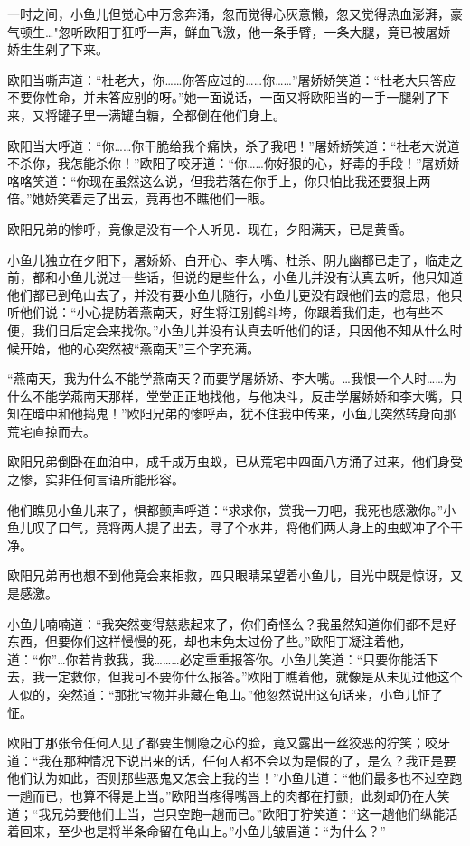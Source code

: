\documentclass[12pt,oneside]{book}
\begin{document}
一时之间，小鱼儿但觉心中万念奔涌，忽而觉得心灰意懒，忽又觉得热血澎湃，豪气顿生\ldots"忽听欧阳丁狂呼一声，鲜血飞激，他一条手臂，一条大腿，竟已被屠娇娇生生剁了下来。

欧阳当嘶声道：``杜老大，你\ldots\ldots 你答应过的\ldots\ldots 你\ldots\ldots{}''屠娇娇笑道：``杜老大只答应不要你性命，并未答应别的呀。''她一面说话，一面又将欧阳当的一手一腿剁了下来，又将罐子里一满罐白糖，全都倒在他们身上。

欧阳当大呼道：``你\ldots\ldots 你干脆给我个痛快，杀了我吧！''屠娇娇笑道：``杜老大说道不杀你，我怎能杀你！''欧阳了咬牙道：``你\ldots\ldots 你好狠的心，好毒的手段！''屠娇娇咯咯笑道：``你现在虽然这么说，但我若落在你手上，你只怕比我还要狠上两倍。''她娇笑着走了出去，竟再也不瞧他们一眼。

欧阳兄弟的惨呼，竟像是没有一个人听见．现在，夕阳满天，已是黄昏。

小鱼儿独立在夕阳下，屠娇娇、白开心、李大嘴、杜杀、阴九幽都已走了，临走之前，都和小鱼儿说过一些话，但说的是些什么，小鱼儿并没有认真去听，他只知道他们都已到龟山去了，并没有要小鱼儿随行，小鱼儿更没有跟他们去的意思，他只听他们说：``小心提防着燕南天，好生将江别鹤斗垮，你跟着我们走，也有些不便，我们日后定会来找你。''小鱼儿并没有认真去听他们的话，只因他不知从什么时候开始，他的心突然被``燕南天''三个字充满。

``燕南天，我为什么不能学燕南天？而要学屠娇娇、李大嘴。\ldots 我恨一个人时\ldots\ldots 为什么不能学燕南天那样，堂堂正正地找他，与他决斗，反击学屠娇娇和李大嘴，只知在暗中和他捣鬼！''欧阳兄弟的惨呼声，犹不住我中传来，小鱼儿突然转身向那荒宅直掠而去。

欧阳兄弟倒卧在血泊中，成千成万虫蚁，已从荒宅中四面八方涌了过来，他们身受之惨，实非任何言语所能形容。

他们瞧见小鱼儿来了，惧都颤声呼道：``求求你，赏我一刀吧，我死也感激你。''小鱼儿叹了口气，竟将两人提了出去，寻了个水井，将他们两人身上的虫蚁冲了个干净。

欧阳兄弟再也想不到他竟会来相救，四只眼睛呆望着小鱼儿，目光中既是惊讶，又是感激。

小鱼儿喃喃道：``我突然变得慈悲起来了，你们奇怪么？我虽然知道你们都不是好东西，但要你们这样慢慢的死，却也未免太过份了些。''欧阳丁凝注着他，道：``你''\ldots 你若肯救我，我\ldots\ldots\ldots 必定重重报答你。小鱼儿笑道：``只要你能活下去，我一定救你，但我可不要你什么报答。''欧阳丁瞧着他，就像是从未见过他这个人似的，突然道：``那批宝物并非藏在龟山。''他忽然说出这句话来，小鱼儿怔了怔。

欧阳丁那张令任何人见了都要生恻隐之心的脸，竟又露出一丝狡恶的狞笑；咬牙道：``我在那种情况下说出来的话，任何人都不会以为是假的了，是么？我正是要他们认为如此，否则那些恶鬼又怎会上我的当！''小鱼儿道：``他们最多也不过空跑一趟而已，也算不得是上当。''欧阳当疼得嘴唇上的肉都在打颤，此刻却仍在大笑道；``我兄弟要他们上当，岂只空跑─趟而已。''欧阳丁狞笑道：``这一趟他们纵能活着回来，至少也是将半条命留在龟山上。''小鱼儿皱眉道：``为什么？''
\end{document}
